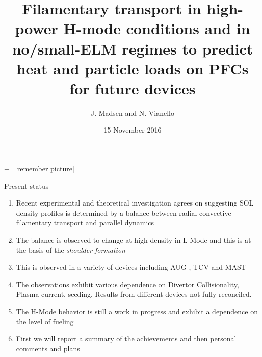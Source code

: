 \documentclass[10pt, compress, draft]{beamer}
\title{Filamentary transport in high-power H-mode conditions and in
  no/small-ELM regimes to predict heat and particle loads on PFCs for
  future devices}
\date{15 November 2016}
\author[J. Madsen and N.Vianello]{J. Madsen and N. Vianello}
\begin{document}
+=[remember picture]
\maketitle
\begin{frame}{Present status}
  \begin{enumerate}[<+(1) | invisible@-+>]
    \item Recent experimental and theoretical investigation agrees on
      suggesting SOL density profiles is determined by a balance
      between radial convective filamentary transport and parallel dynamics
    \item The balance is observed to change at high density in L-Mode
      and this is at the basis of the \emph{shoulder formation}
    \item This is observed in a variety of devices including AUG \parencite{Carralero:2014gs},
      TCV \parencite{Garcia:2007p2615} and MAST \parencite{Militello:2016hk}
    \item The observations exhibit various dependence on Divertor
      Collisionality, Plasma current,  seeding. \alert{Results from
        different devices not fully reconciled.}
    \item The H-Mode behavior is still a work in progress and exhibit
      a dependence on the level of \alert{fueling}
    \item First we will report a summary of the achievements and then
     personal comments and plans
    \end{enumerate}
\end{frame}
\end{document}
